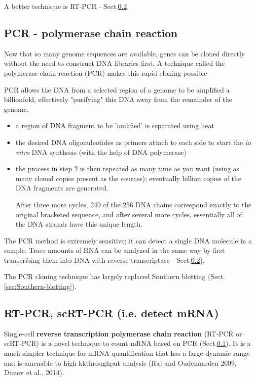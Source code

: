A better technique is RT-PCR - Sect.\ref{sec:RT-PCR}.

\subsection{PCR - polymerase chain reaction}
\label{sec:PCR}

Now that so many genome sequences are available, genes can be cloned directly
without the need to construct DNA libraries first. A technique called the
polymerase chain reaction (PCR) makes this rapid cloning possible 

PCR allows the DNA from a selected region of a genome to be amplified a
billionfold, effectively "purifying" this DNA away from the remainder of the genome.
\begin{itemize}
  \item a region of DNA fragment to be 'amlified' is separated using heat
  
  \item the desired DNA oligonuleotides as primers attach to each side to start
  the {\it in vitro} DNA synthesis (with the help of DNA polymerase)
  
  \item the process in step 2 is then repeated as many time as you want (using
  as many cloned copies present as the sources); eventually billion copies of
  the DNA fragments are generated.
  
  After three more cycles, 240 of the 256 DNA chains correspond exactly to the
  original bracketed sequence, and after several more cycles, essentially all of
  the DNA strands have this unique length. 
\end{itemize}

The PCR method is extremely sensitive; it can detect a single DNA molecule in a
sample. Trace amounts of RNA can be analyzed in the same way by first
transcribing them into DNA with reverse transcriptase - Sect.\ref{sec:RT-PCR}).

The PCR cloning technique has largely replaced Southern blotting
(Sect.\ref{sec:Southern-blotting}).

\subsection{RT-PCR, scRT-PCR (i.e. detect mRNA)}
\label{sec:RT-PCR}
\label{sec:scRT-PCR}

Single-cell {\bf reverse transcription polymerase chain reaction} (RT-PCR or
scRT-PCR) is a novel technique to count mRNA based on PCR (Sect.\ref{sec:PCR}).
It is a much simpler technique for mRNA quantification that has a large dynamic
range and is amenable to high kkthroughput analysis (Raj and Oudennarden 2009,
Dimov et al., 2014).

